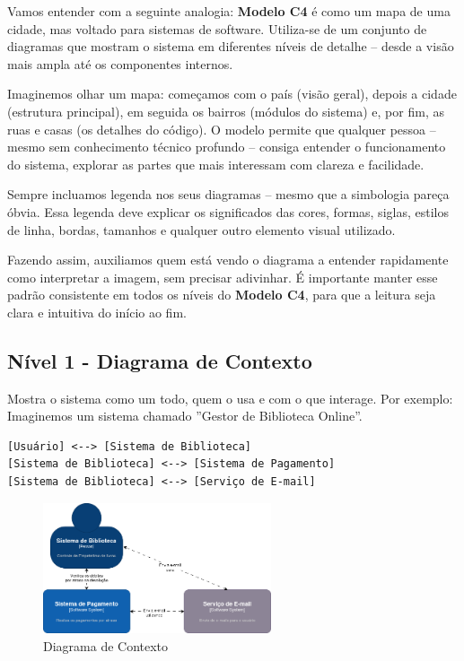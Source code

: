 \documentclass[a4paper,11pt]{article}
\begin{document}
Vamos entender com a seguinte analogia: \textbf{Modelo C4} é como um mapa de uma cidade, mas
voltado para sistemas de software. Utiliza-se de um conjunto de diagramas que mostram o sistema
em diferentes níveis de detalhe -- desde a visão mais ampla até os componentes internos.

Imaginemos olhar um mapa: começamos com o país (visão geral), depois a cidade (estrutura
principal), em seguida os bairros (módulos do sistema) e, por fim, as ruas e casas (os detalhes do código). O modelo permite que qualquer pessoa -- mesmo sem conhecimento técnico profundo -- consiga entender o funcionamento do sistema, explorar as partes que mais interessam com clareza e facilidade.

Sempre incluamos legenda nos seus diagramas -- mesmo que a simbologia pareça óbvia. Essa legenda deve explicar os significados das cores, formas, siglas, estilos de linha, bordas, tamanhos e qualquer outro elemento visual utilizado. 

Fazendo assim, auxiliamos quem está vendo o diagrama a entender rapidamente como interpretar a imagem, sem precisar adivinhar. É importante manter esse padrão consistente em todos os níveis do \textbf{Modelo C4}, para que a leitura seja clara e intuitiva do início ao fim.

\subsection{Nível 1 - Diagrama de Contexto}
Mostra o sistema como um todo, quem o usa e com o que interage. Por exemplo: Imaginemos um
sistema chamado ”Gestor de Biblioteca Online”. \vspace{-1em}
\begin{verbatim}
[Usuário] <--> [Sistema de Biblioteca]
[Sistema de Biblioteca] <--> [Sistema de Pagamento]
[Sistema de Biblioteca] <--> [Serviço de E-mail]
\end{verbatim}

\begin{figure}[!htb]
	\centering
	\includegraphics[width=0.6\textwidth]{imagens/Contexto}
	\caption{Diagrama de Contexto}
\end{figure}
\end{document}

